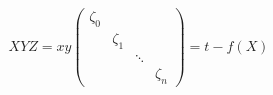 \begin{equation}
XYZ =xy \begin{pmatrix}\zeta_{0} &&&\\
&\zeta_1 &&\\
&& \ddots &\\
&&&\zeta_n
\end{pmatrix} = t - f(X)
\end{equation}


